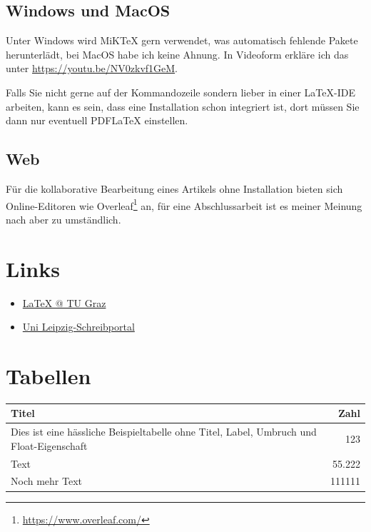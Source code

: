\subsection{Windows und MacOS}

Unter Windows wird MiK\TeX{} gern verwendet, was automatisch fehlende Pakete herunterlädt, bei MacOS habe ich keine Ahnung.
In Videoform erkläre ich das unter \url{https://youtu.be/NV0zkvf1GeM}.

Falls Sie nicht gerne auf der Kommandozeile sondern lieber in einer \LaTeX{}-IDE arbeiten, kann es sein, dass eine Installation schon integriert ist, dort müssen Sie dann nur eventuell PDF\LaTeX{} einstellen.

\subsection{Web}
Für die kollaborative Bearbeitung eines Artikels ohne Installation bieten sich Online-Editoren wie Overleaf\footnote{\url{https://www.overleaf.com/}} an, für eine Abschlussarbeit ist es meiner Meinung nach aber zu umständlich.

\section{Links}

\begin{itemize}
\item \href{https://latex.tugraz.at/}{\LaTeX{} @ TU Graz}
\item \href{https://home.uni-leipzig.de/schreibportal/}{Uni Leipzig-Schreibportal}
\end{itemize}

\section{Tabellen}

\begin{tabular}{|l|r|}
\hline
Titel									&Zahl\\
\hline
Dies ist eine hässliche Beispieltabelle	ohne Titel, Label, Umbruch und Float-Eigenschaft &123\\
Text									&55.222\\
Noch mehr Text							&111111\\
\hline
\end{tabular}

